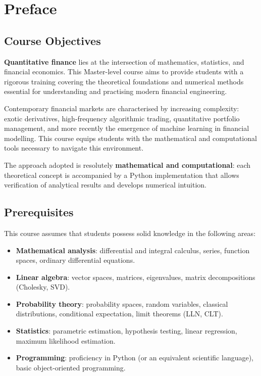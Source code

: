 \chapter*{Preface}

\section*{Course Objectives}

\textbf{Quantitative finance} lies at the intersection of mathematics,
statistics, and financial economics. This Master-level course aims to provide
students with a rigorous training covering the theoretical foundations and
numerical methods essential for understanding and practising modern
financial engineering.

Contemporary financial markets are characterised by increasing complexity:
exotic derivatives, high-frequency algorithmic trading, quantitative portfolio
management, and more recently the emergence of machine learning in financial
modelling. This course equips students with the mathematical and computational
tools necessary to navigate this environment.

The approach adopted is resolutely \textbf{mathematical and computational}:
each theoretical concept is accompanied by a Python implementation that
allows verification of analytical results and develops numerical intuition.

\section*{Prerequisites}

This course assumes that students possess solid knowledge in the following areas:

\begin{itemize}
    \item \textbf{Mathematical analysis}: differential and integral calculus,
          series, function spaces, ordinary differential equations.
    \item \textbf{Linear algebra}: vector spaces, matrices, eigenvalues,
          matrix decompositions (Cholesky, SVD).
    \item \textbf{Probability theory}: probability spaces, random variables,
          classical distributions, conditional expectation, limit theorems
          (LLN, CLT).
    \item \textbf{Statistics}: parametric estimation, hypothesis testing,
          linear regression, maximum likelihood estimation.
    \item \textbf{Programming}: proficiency in Python (or an equivalent
          scientific language), basic object-oriented programming.
\end{itemize}


